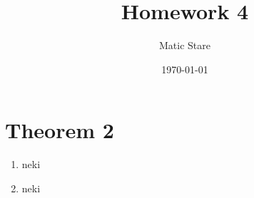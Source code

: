 \documentclass{article}
\title{Homework 4}
\author{Matic Stare}
\date{\today}
\begin{document}
\maketitle

\tableofcontents
\newpage

\section{Theorem 2}\label{sec:p1}

\begin{enumerate}[label*=\alph*)]
    \item neki
    \item neki
\end{enumerate}
\end{document}
